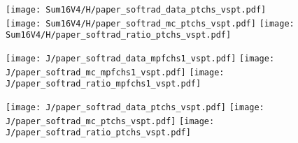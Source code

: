 \documentclass[landscape,10pt]{beamer} %
\begin{document}
\begin{figure}[p]
\centering
  \texttt{[image: Sum16V4/H/paper\_softrad\_data\_ptchs\_vspt.pdf]}
  \texttt{[image: Sum16V4/H/paper\_softrad\_mc\_ptchs\_vspt.pdf]}
  \texttt{[image: Sum16V4/H/paper\_softrad\_ratio\_ptchs\_vspt.pdf]}
\end{figure}

\newpage

\begin{figure}[p]
\centering
  \texttt{[image: J/paper\_softrad\_data\_mpfchs1\_vspt.pdf]}
  \texttt{[image: J/paper\_softrad\_mc\_mpfchs1\_vspt.pdf]}
  \texttt{[image: J/paper\_softrad\_ratio\_mpfchs1\_vspt.pdf]}
\end{figure}

\begin{figure}[p]
\centering
  \texttt{[image: J/paper\_softrad\_data\_ptchs\_vspt.pdf]}
  \texttt{[image: J/paper\_softrad\_mc\_ptchs\_vspt.pdf]}
  \texttt{[image: J/paper\_softrad\_ratio\_ptchs\_vspt.pdf]}
\end{figure}

\newpage
\end{document}

